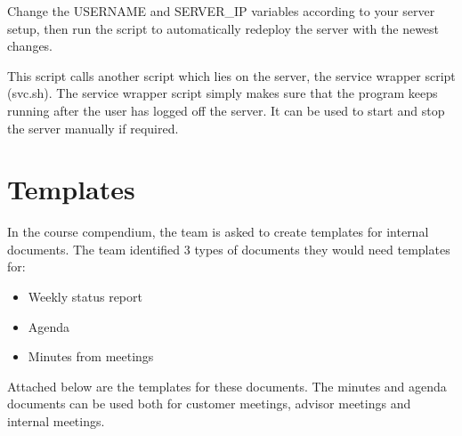 \documentclass[11pt,a4paper,titlepage,oneside]{report}
\begin{document}
Change the USERNAME and SERVER\_IP variables according to your server setup, then run the script to automatically redeploy the server with the newest changes.

This script calls another script which lies on the server, the service wrapper script (svc.sh).
The service wrapper script simply makes sure that the program keeps running after the user has logged off the server. It can be used to start and stop the server manually if required.

\chapter{Templates}
In the course compendium, the team is asked to create templates for internal documents. The team identified 3 types of documents they would need templates for:

\begin{itemize}
\item Weekly status report
\item Agenda
\item Minutes from meetings
\end{itemize}

Attached below are the templates for these documents. The minutes and agenda documents can be used both for customer meetings, advisor meetings and internal meetings.




\end{document}
